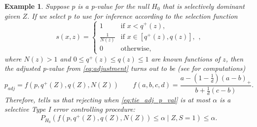 \documentclass{article}
\newtheorem{example}{Example}
\begin{document}
\begin{example}
    \label{exm:rank_verification_exp_fam}
    Suppose $p$ is a p-value for the null $H_0$ that is selectively dominant given $Z$. If we select $p$ to use for inference according to the selection function 
    \begin{equation*}
        s(x, z) = 
        \begin{cases} 
        1 & \text{if } x < q^+(z), \\
        \frac{1}{N(z)} & \text{if } x \in [q^+(z), q(z)], \\
        0 & \text{otherwise},
        \end{cases},
    \end{equation*}
    where $N(z)> 1$ and $0 \leq q^{+}(z) \leq q(z) \leq 1$ are known functions of $z$, then the adjusted p-value from \eqref{eq:adjustment} turns out to be (see  for computations)
    \begin{equation}
            \label{eq:tie_adj_p_val}
            p_{adj} = f(p, q^+(Z), q(Z), N(Z)) \qquad f(a, b, c, d) =   \frac{a - (1 - \frac{1}{d})(a - b)_+}{b + \frac{1}{d}(c - b)}. 
     \end{equation}
    Therefore,  tells us that rejecting when \eqref{eq:tie_adj_p_val} is at most $\alpha$ is a selective Type I error controlling procedure:
    \begin{equation}
        \label{eq:tie_tool}
        P_{H_0}\left(f(p, q^+(Z), q(Z), N(Z))  \leq \alpha \mid Z, S = 1\right) \leq \alpha.  
    \end{equation} 


\end{example}
\end{document}
